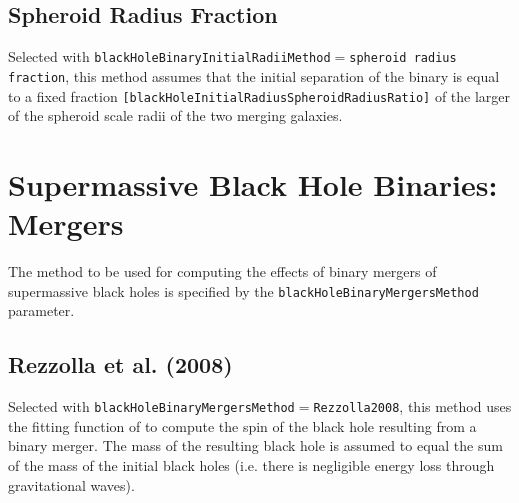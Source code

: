 \subsection{Spheroid Radius Fraction}

Selected with {\tt blackHoleBinaryInitialRadiiMethod}$=${\tt spheroid radius fraction}, this method assumes that the initial separation of the binary is equal to a fixed fraction {\tt [blackHoleInitialRadiusSpheroidRadiusRatio]} of the larger of the spheroid scale radii of the two merging galaxies.

\section{Supermassive Black Hole Binaries: Mergers}

The method to be used for computing the effects of binary mergers of supermassive black holes is specified by the {\tt blackHoleBinaryMergersMethod} parameter.

\subsection{Rezzolla et al. (2008)}

Selected with {\tt blackHoleBinaryMergersMethod}$=${\tt Rezzolla2008}, this method uses the fitting function of \cite{rezzolla_final_2008} to compute the spin of the black hole resulting from a binary merger. The mass of the resulting black hole is assumed to equal the sum of the mass of the initial black holes (i.e. there is negligible energy loss through gravitational waves).

